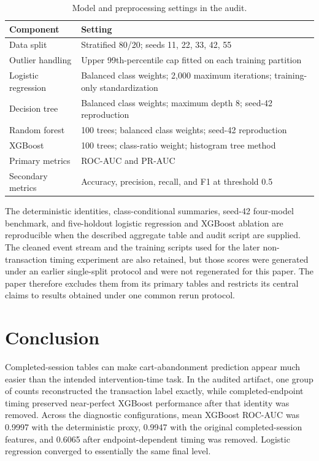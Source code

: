 \documentclass[conference, letterpaper]{IEEEtran}
\begin{document}
\begin{table}[t]
\caption{Model and preprocessing settings in the audit.}
\label{tab:settings}
\centering
\scriptsize
\begin{tabularx}{\columnwidth}{@{}L{0.30\columnwidth}Y@{}}
\toprule
Component & Setting \\
\midrule
Data split & Stratified 80/20; seeds 11, 22, 33, 42, 55 \\
Outlier handling & Upper 99th-percentile cap fitted on each training partition \\
Logistic regression & Balanced class weights; 2,000 maximum iterations; training-only standardization \\
Decision tree & Balanced class weights; maximum depth 8; seed-42 reproduction \\
Random forest & 100 trees; balanced class weights; seed-42 reproduction \\
XGBoost & 100 trees; class-ratio weight; histogram tree method \\
Primary metrics & ROC-AUC and PR-AUC \\
Secondary metrics & Accuracy, precision, recall, and F1 at threshold 0.5 \\
\bottomrule
\end{tabularx}
\end{table}

The deterministic identities, class-conditional summaries, seed-42 four-model benchmark, and five-holdout logistic regression and XGBoost ablation are reproducible when the described aggregate table and audit script are supplied. The cleaned event stream and the training scripts used for the later non-transaction timing experiment are also retained, but those scores were generated under an earlier single-split protocol and were not regenerated for this paper. The paper therefore excludes them from its primary tables and restricts its central claims to results obtained under one common rerun protocol.

\section{Conclusion}
Completed-session tables can make cart-abandonment prediction appear much easier than the intended intervention-time task. In the audited artifact, one group of counts reconstructed the transaction label exactly, while completed-endpoint timing preserved near-perfect XGBoost performance after that identity was removed. Across the diagnostic configurations, mean XGBoost ROC-AUC was 0.9997 with the deterministic proxy, 0.9947 with the original completed-session features, and 0.6065 after endpoint-dependent timing was removed. Logistic regression converged to essentially the same final level.
\end{document}
